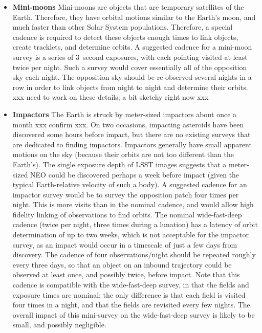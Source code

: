 \begin{itemize}

\item{{\bf Mini-moons}}
Mini-moons are objects that are temporary satellites of the Earth.
Therefore, they have orbital motions similar to the Earth's moon,
and much faster than other Solar System populations. Therefore,
a special cadence is required to detect these objects enough
times to link objects, create tracklets, and determine orbits.
A suggested cadence for a mini-moon survey is a series
of 3~second exposures, with each pointing visited at least
twice per night. Such a survey would cover essentially
all of the opposition sky each night. The opposition sky should
be re-observed several nights in a row in order to
link objects from night to night and determine their orbits.
xxx need to work on these details; a bit sketchy right now xxx

\item{{\bf Impactors}}
The Earth is struck by meter-sized impactors about
once a month xxx confirm xxx.
On two occasions, impacting asteroids have
been discovered some hours before impact, but
there are no existing surveys that are dedicated to finding
impactors.
Impactors generally have small apparent motions
on the sky (because their orbits are not too different
than the Earth's). The single exposure depth of LSST
images suggests that a meter-sized NEO could be
discovered perhaps a week before impact (given
the typical Earth-relative velocity of such a body).
A suggested cadence for an impactor survey would be
to survey the opposition patch four times per night.
This is more visits than in the nominal cadence, and
would allow high fidelity linking of observations to
find orbits. The nominal wide-fast-deep cadence
(twice per night, three times during a lunation) has
a latency of orbit determination of up to two weeks,
which is not acceptable for the impactor survey, as an
impact would occur in a timescale of just a few days
from discovery.
The cadence of four observations/night should be repeated
roughly every three days, so that an object on an
inbound trajectory could be observed at least once,
and possibly twice, before impact.
Note that this cadence is compatible with
the wide-fast-deep survey, in that the fields and
exposure times are nominal; the only difference is that
each field is visited four times in a night, and that
the fields are revisited every few nights. The overall
impact of this mini-survey on the wide-fast-deep
survey is likely to be small, and possibly negligible.


\end{itemize}
